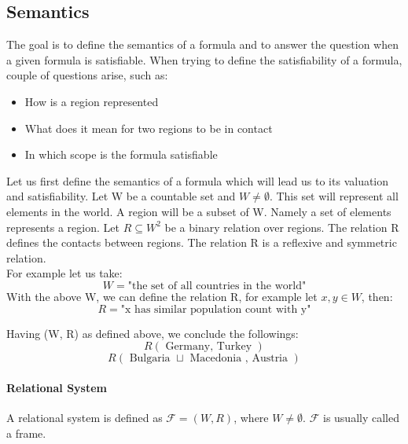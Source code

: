 \documentclass{article}
\begin{document}
	\subsection{Semantics}
The goal is to define the semantics of a formula and to answer the question when a given formula is satisfiable.
When trying to define the satisfiability of a formula, couple of questions arise, such as:
		\begin{itemize}
			\item How is a region represented 
			\item What does it mean for two regions to be in contact
			\item In which scope is the formula satisfiable
		\end{itemize}
Let us first define the semantics of a formula which will lead us to its valuation and satisfiability.
\newline
Let W be a countable set and $W \neq \emptyset$. This set will represent all elements in the world.
A region will be a subset of W. Namely a set of elements represents a region.
Let $R \subseteq W^2$ be a binary relation over regions. The relation R defines the contacts between regions.
The relation R is a reflexive and symmetric relation. \\
For example let us take:
		\begin{equation*}
			W = \text{"the set of all countries in the world"}
		\end{equation*}
With the above W, we can define the relation R, for example let $x, y \in W$, then:
		\begin{equation*}
			R = \text{"x has similar population count with y"}
		\end{equation*}

Having (W, R) as defined above, we conclude the followings: 
		\begin{equation*}
			R(\text{ Germany, Turkey })
		 \end{equation*}
		\begin{equation*}
			R(\text{ Bulgaria } \sqcup \text{ Macedonia , Austria })
		 \end{equation*}
	\paragraph{Relational System} A relational system is defined as $\mathcal{F} = (W, R)$, where $W \neq \emptyset$. $\mathcal{F}$ is usually called a frame.
\end{document}
